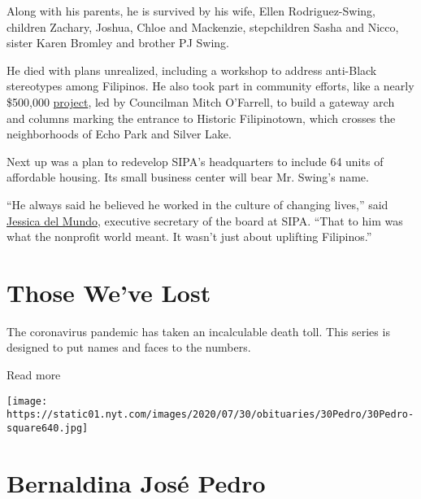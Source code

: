 Along with his parents, he is survived by his wife, Ellen
Rodriguez-Swing, children Zachary, Joshua, Chloe and Mackenzie,
stepchildren Sasha and Nicco, sister Karen Bromley and brother PJ Swing.

He died with plans unrealized, including a workshop to address
anti-Black stereotypes among Filipinos. He also took part in community
efforts, like a nearly \$500,000
\href{https://www.theeastsiderla.com/neighborhoods/historic_filipinotown/plans-unveiled-for-452-000-gateway-to-historic-filipinotown/article_096736f6-ad28-11ea-8a45-d34c6d8d6822.html\#:~:text=\%22Historic\%20Filipinotown\%20will\%20have\%20a,\%2C\%22\%20O'Farrell\%20said.\&text=Designed\%20by\%20Filipino\%20artist\%20Eliseo,Gabay\%3A\%20Our\%20Guiding\%20Star.\%E2\%80\%9D}{project},
led by Councilman Mitch O'Farrell, to build a gateway arch and columns
marking the entrance to Historic Filipinotown, which crosses the
neighborhoods of Echo Park and Silver Lake.

Next up was a plan to redevelop SIPA's headquarters to include 64 units
of affordable housing. Its small business center will bear Mr. Swing's
name.

``He always said he believed he worked in the culture of changing
lives,'' said \href{https://sipacares.org/about/board/}{Jessica del
Mundo}, executive secretary of the board at SIPA. ``That to him was what
the nonprofit world meant. It wasn't just about uplifting Filipinos.''

\href{https://www.nytimes.com/interactive/2020/obituaries/people-died-coronavirus-obituaries.html?action=click\&pgtype=Article\&state=default\&region=BELOW_MAIN_CONTENT\&context=covid_obits_promo}{}

\hypertarget{those-weve-lost}{%
\section{Those We've Lost}\label{those-weve-lost}}

The coronavirus pandemic has taken an incalculable death toll. This
series is designed to put names and faces to the numbers.

Read more

\texttt{[image: https://static01.nyt.com/images/2020/07/30/obituaries/30Pedro/30Pedro-square640.jpg]}

\hypertarget{bernaldina-josuxe9-pedro}{%
\section{Bernaldina José Pedro}\label{bernaldina-josuxe9-pedro}}

